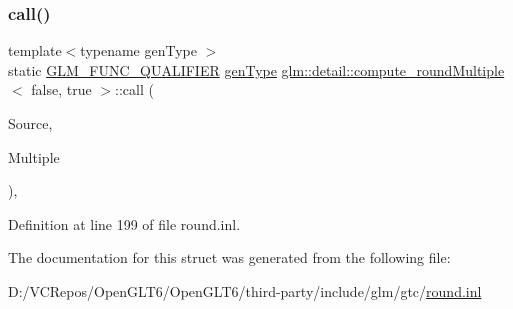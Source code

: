 \subsubsection{\texorpdfstring{call()}{call()}}
{\footnotesize\ttfamily template$<$typename gen\+Type $>$ \\
static \mbox{\hyperlink{setup_8hpp_a33fdea6f91c5f834105f7415e2a64407}{G\+L\+M\+\_\+\+F\+U\+N\+C\+\_\+\+Q\+U\+A\+L\+I\+F\+I\+ER}} \mbox{\hyperlink{structglm_1_1detail_1_1gen_type}{gen\+Type}} \mbox{\hyperlink{structglm_1_1detail_1_1compute__round_multiple}{glm\+::detail\+::compute\+\_\+round\+Multiple}}$<$ false, true $>$\+::call (\begin{DoxyParamCaption}\item[{\mbox{\hyperlink{structglm_1_1detail_1_1gen_type}{gen\+Type}}}]{Source,  }\item[{\mbox{\hyperlink{structglm_1_1detail_1_1gen_type}{gen\+Type}}}]{Multiple }\end{DoxyParamCaption})\hspace{0.3cm}{\ttfamily [inline]}, {\ttfamily [static]}}



Definition at line 199 of file round.\+inl.



The documentation for this struct was generated from the following file\+:\begin{DoxyCompactItemize}
\item 
D\+:/\+V\+C\+Repos/\+Open\+G\+L\+T6/\+Open\+G\+L\+T6/third-\/party/include/glm/gtc/\mbox{\hyperlink{round_8inl}{round.\+inl}}\end{DoxyCompactItemize}
